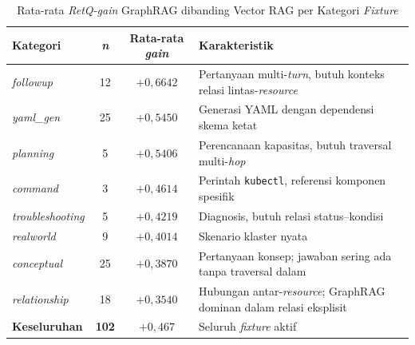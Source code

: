 \renewcommand{\arraystretch}{1.3}
\captionsetup[table]{justification=raggedright,singlelinecheck=false}
\begin{table}[H]
\caption{Rata-rata \textit{RetQ-gain} GraphRAG dibanding Vector RAG per Kategori \textit{Fixture}}
\label{tbl:retq_gain_by_type}
\centering
\begin{tabular}{| p{} | c | c | p{} |}
\hline
\textbf{Kategori} & \textbf{\textit{n}} & \textbf{Rata-rata \textit{gain}} & \textbf{Karakteristik} \\
\hline
\textit{followup}        & 12 & \textbf{$+0{,}6642$} & Pertanyaan multi-\textit{turn}, butuh konteks relasi lintas-\textit{resource} \\
\hline
\textit{yaml\_gen}       & 25 & $+0{,}5450$ & Generasi YAML dengan dependensi skema ketat \\
\hline
\textit{planning}        &  5 & $+0{,}5406$ & Perencanaan kapasitas, butuh traversal multi-\textit{hop} \\
\hline
\textit{command}         &  3 & $+0{,}4614$ & Perintah \texttt{kubectl}, referensi komponen spesifik \\
\hline
\textit{troubleshooting} &  5 & $+0{,}4219$ & Diagnosis, butuh relasi status--kondisi \\
\hline
\textit{realworld}       &  9 & $+0{,}4014$ & Skenario klaster nyata \\
\hline
\textit{conceptual}      & 25 & $+0{,}3870$ & Pertanyaan konsep; jawaban sering ada tanpa traversal dalam \\
\hline
\textit{relationship}    & 18 & $+0{,}3540$ & Hubungan antar-\textit{resource}; GraphRAG dominan dalam relasi eksplisit \\
\hline
\textbf{Keseluruhan}     & \textbf{102} & $+0{,}467$ & Seluruh \textit{fixture} aktif \\
\hline
\end{tabular}
\end{table}